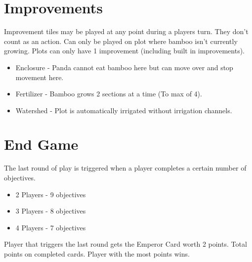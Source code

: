 \documentclass[12pt]{article}
\newenvironment{itemizeCustom}
{\begin{itemize}
  \setlength{\itemsep}{1pt}
  \setlength{\parskip}{0pt}
  \setlength{\parsep}{0pt}}
{\end{itemize}}
\begin{document}
\begin{mdframed}[style = customFrame]
\begin{multicols*}{2}
\section*{Improvements}
Improvement tiles may be played at any point during a players turn. They don't count as an action. Can only be played on plot where bamboo isn't currently growing. Plots can only have 1 improvement (including built in improvements).
\begin{itemizeCustom}
	\item Enclosure - Panda cannot eat bamboo here but can move over and stop movement here.
	\item Fertilizer - Bamboo grows 2 sections at a time (To max of 4).
	\item Watershed - Plot is automatically irrigated without irrigation channels.
\end{itemizeCustom}

\section*{End Game}
The last round of play is triggered when a player completes a certain number of objectives.
\begin{itemizeCustom}
	\item 2 Players - 9 objectives
	\item 3 Players - 8 objectives
	\item 4 Players - 7 objectives
\end{itemizeCustom}

Player that triggers the last round gets the Emperor Card worth 2 points. Total points on completed cards. Player with the most points wins.

\end{multicols*}
\end{mdframed}
\end{document}
